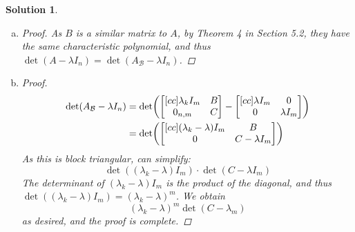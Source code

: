 \documentclass[11pt]{scrartcl}
\theoremstyle{dotlessP}
\newtheorem{sol}{Solution}[section]
\theoremstyle{dotlessN}
\DeclarePairedDelimiter\paren{(}{)} %
\newcommand{\basis}{\mathcal{B}}
\begin{document}
\begin{sol}
\begin{enumerate}[(a)]
\begin{proof}
\end{proof}
\item 
	\begin{proof}
		As $B$ is a similar matrix to $A$, by Theorem 4 in Section 5.2, they have the same characteristic polynomial, and thus $\det(A-\lambda I_n) = \det(A_\basis - \lambda I_n)$.
	\end{proof}
\item 
	\begin{proof}
		\begin{align*}
			\det(A_\basis - \lambda I_n) &=
		\det\paren*{
			\begin{bmatrix}[cc]
	\lambda_k I_m & B \\
	0_{n,m} & C
\end{bmatrix} - 
\begin{bmatrix}[cc]
	\lambda I_m & 0 \\
	0 & \lambda I_m
\end{bmatrix}
		} \\
		&=
		\det \paren*{
			\begin{bmatrix}[cc]
	(\lambda_k - \lambda)I_m & B \\
	0 & C - \lambda I_m
\end{bmatrix}
		}
		\end{align*}
		As this is block triangular, can simplify:
		\[
		\det((\lambda_k - \lambda)I_m) \cdot \det (C - \lambda I_m) 
		\] 
		The determinant of $(\lambda_k - \lambda)I_m$ is the product of the diagonal, and thus $\det((\lambda_k - \lambda)I_m) = (\lambda_k - \lambda)^m$. We obtain
		 \[
			 (\lambda_k - \lambda)^m \det(C - \lambda_m)
		\] 
		as desired, and the proof is complete.
	\end{proof}
		\end{enumerate}
	\end{sol}
\end{document}
